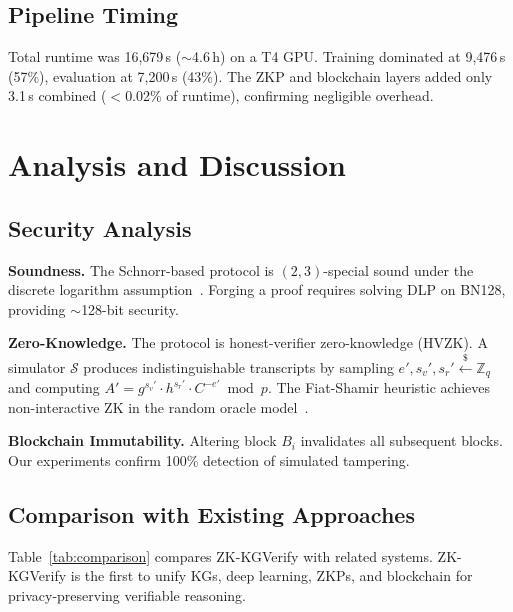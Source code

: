 \documentclass[runningheads]{llncs}
\newcommand{\Z}{\mathbb{Z}}
\begin{document}
\subsection{Pipeline Timing}

Total runtime was 16,679\,s (${\sim}$4.6\,h) on a T4 GPU. Training dominated at 9,476\,s (57\%), evaluation at 7,200\,s (43\%). The ZKP and blockchain layers added only 3.1\,s combined ($<$0.02\% of runtime), confirming negligible overhead.

\section{Analysis and Discussion}
\label{sec:analysis}

\subsection{Security Analysis}

\textbf{Soundness.} The Schnorr-based protocol is $(2,3)$-special sound under the discrete logarithm assumption~\cite{schnorr1991efficient}. Forging a proof requires solving DLP on BN128, providing ${\sim}$128-bit security.

\textbf{Zero-Knowledge.} The protocol is honest-verifier zero-knowledge (HVZK). A simulator $\mathcal{S}$ produces indistinguishable transcripts by sampling $e', s_v', s_r' \xleftarrow{\$} \Z_q$ and computing $A' = g^{s_v'} \cdot h^{s_r'} \cdot C^{-e'} \bmod p$. The Fiat-Shamir heuristic achieves non-interactive ZK in the random oracle model~\cite{fiat1986prove}.

\textbf{Blockchain Immutability.} Altering block $B_i$ invalidates all subsequent blocks. Our experiments confirm 100\% detection of simulated tampering.

\subsection{Comparison with Existing Approaches}

Table~\ref{tab:comparison} compares ZK-KGVerify with related systems. ZK-KGVerify is the first to unify KGs, deep learning, ZKPs, and blockchain for privacy-preserving verifiable reasoning.
\end{document}
